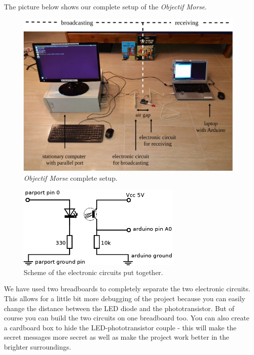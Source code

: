 \documentclass[10pt]{report}
\begin{document}
The picture below shows our complete setup of the \textit{Objectif Morse}.

\begin{figure}[H]
\centering\includegraphics[width=14.5cm]{full_setup}
\caption{\textit{Objectif Morse} complete setup.}				
\label{fig:full_setup}
\end{figure}

\begin{figure}[H]
\centering\includegraphics[width=8cm]{scheme}
\caption{Scheme of the electronic circuits put together.}				
\label{fig:circuits}
\end{figure}

We have used two breadboards to completely separate the two electronic circuits. This allows for a little bit more debugging of the project because you can easily change the distance between the LED diode and the phototransistor. But of course you can build the two circuits on one breadboard too. You can also create a cardboard box to hide the LED-phototransistor couple - this will make the secret messages more secret as well as make the project work better in the brighter surroundings.
\end{document}
